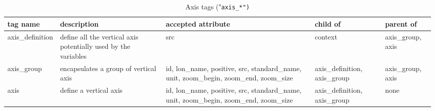 \documentclass[../main/NEMO_manual]{subfiles}
\begin{document}
\begin{table}
  \scriptsize
  \begin{tabularx}{\textwidth}{|l|X|X|X|X|}
    \hline
    tag name                                                                               &
    description                                                                            &
    accepted attribute                                                                     &
    child of                                                                               &
    parent of         \\
    \hline
    \hline
    axis\_definition                                                                       &
    define all the vertical axis potentially used by the variables                         &
    src                                                                                    &
    context                                                                                &
    axis\_group, axis \\
    \hline
    axis\_group                                                                            &
    encapsulates a group of vertical axis                                                  &
    id, lon\_name, positive, src, standard\_name, unit, zoom\_begin, zoom\_end, zoom\_size &
    axis\_definition, axis\_group                                                          &
    axis\_group, axis \\
    \hline
    axis                                                                                   &
    define a vertical axis                                                                 &
    id, lon\_name, positive, src, standard\_name, unit, zoom\_begin, zoom\_end, zoom\_size &
    axis\_definition, axis\_group                                                          &
    none					\\
    \hline
  \end{tabularx}
  \caption{Axis tags ("\tt{axis\_*}")}
\end{table}
\end{document}
